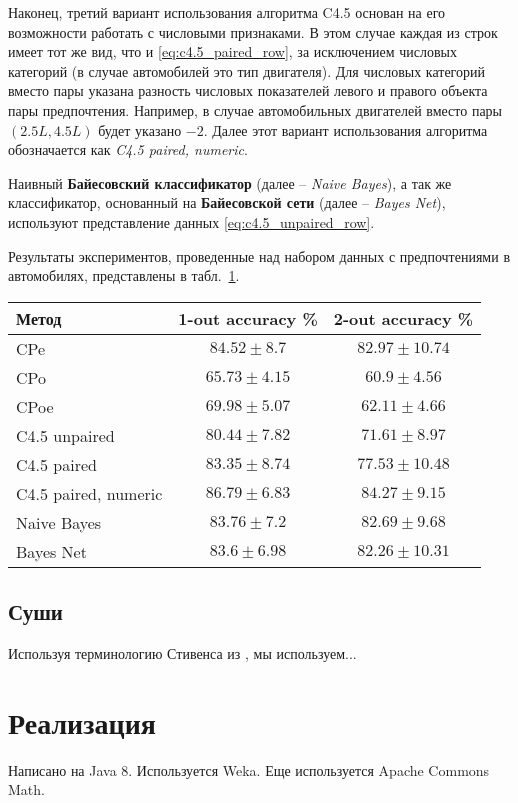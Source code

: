 		Наконец, третий вариант использования алгоритма C4.5 основан на его возможности работать с числовыми признаками. В этом случае каждая из строк имеет тот же вид, что и \eqref{eq:c4.5_paired_row}, за исключением числовых категорий (в случае автомобилей это тип двигателя). Для числовых категорий вместо пары указана разность числовых показателей левого и правого объекта пары предпочтения. Например, в случае автомобильных двигателей вместо пары $(2.5L, 4.5L)$ будет указано $-2$. Далее этот вариант использования алгоритма обозначается как \emph{C4.5 paired, numeric}. 
		
		Наивный \textbf{Байесовский классификатор} (далее – \emph{Naive Bayes}), а так же классификатор, основанный на \textbf{Байесовской сети} (далее – \emph{Bayes Net}), используют представление данных \eqref{eq:c4.5_unpaired_row}. 
		
		Результаты экспериментов, проведенные над набором данных с предпочтениями в автомобилях, представлены в табл.~\ref{tbl:cars_results}. %
	
	\begin{table}[hb]
		\centering
		\begin{tabular}{|l|c|c|}
			\hline
			Метод   & 1-out accuracy \% & 2-out accuracy \% \rule{0pt}{2.4ex} \\
			\hline  
			CPe & $84.52 \pm 8.7$ & $82.97 \pm 10.74$ \rule{0pt}{2.4ex} \\ 
			CPo & $65.73 \pm 4.15$ & $60.9 \pm 4.56$ \\
			CPoe & $69.98 \pm 5.07$ & $62.11 \pm 4.66$ \\ 
			C4.5 unpaired & $80.44 \pm 7.82$ & $71.61 \pm 8.97$ \\ 
			C4.5 paired  & $83.35 \pm 8.74$ & $77.53 \pm 10.48$ \\ 
			C4.5 paired, numeric & $86.79 \pm 6.83$ & $84.27 \pm 9.15$ \\
			Naive Bayes  & $83.76 \pm 7.2$ & $82.69 \pm 9.68$ \\ 
			Bayes Net  & $83.6 \pm 6.98$ & $82.26 \pm 10.31$ \\ 
			\hline
		\end{tabular}
		\label{tbl:cars_results}
	\end{table}
	
	
	\subsection{Суши} 
	\label{subsec:exp_sushi}

Используя терминологию Стивенса из \cite{Stevens:1951}, мы используем...

\section{Реализация}
	Написано на Java 8. Используется Weka. Еще используется Apache Commons Math.
